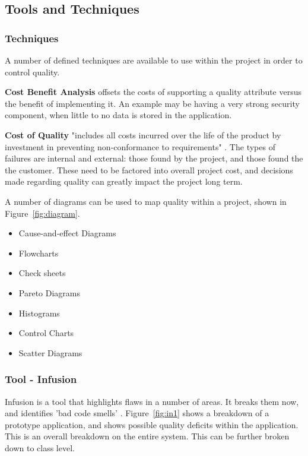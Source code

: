 \subsection{Tools and Techniques}

\subsubsection{Techniques}

A number of defined techniques are available to use within the project in order to control quality. 

\textbf{Cost Benefit Analysis} offsets the costs of supporting a quality attribute versus the benefit of implementing it. An example may be having a very strong security component, when little to no data is stored in the application.

\textbf{Cost of Quality} "includes all costs incurred over the life of the product by investment in preventing non-conformance to requirements" \parencite{pmbok}. The types of failures are internal and external: those found by the project, and those found the the customer. These need to be factored into overall project cost, and decisions made regarding quality can greatly impact the project long term. 

A number of diagrams can be used to map quality within a project, shown in Figure~\ref{fig:diagram}.

\begin{itemize}
\item Cause-and-effect Diagrams
\item Flowcharts
\item Check sheets
\item Pareto Diagrams
\item Histograms
\item Control Charts
\item Scatter Diagrams
\end{itemize}

\subsubsection{Tool - Infusion}

Infusion is a tool that highlights flaws in a number of areas. It breaks them now, and identifies 'bad code smells' \parencite{fowler}. Figure~\ref{fig:in1} shows a breakdown of a prototype application, and shows possible quality deficits within the application. This is an overall breakdown on the entire system. This can be further broken down to class level.

